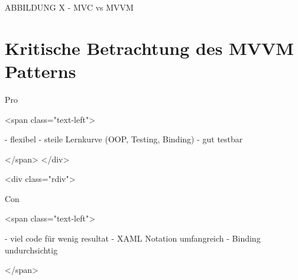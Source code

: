\documentclass[titlepage=false,12pt]{scrreprt}
\begin{document}
ABBILDUNG X - MVC vs MVVM

\chapter{Kritische Betrachtung des MVVM Patterns}



Pro

<span class="text-left">

- flexibel
- steile Lernkurve (OOP, Testing, Binding)
- gut testbar

</span>
</div>

<div class="rdiv">

Con

<span class="text-left">

- viel code für wenig resultat
- XAML Notation umfangreich
- Binding undurchsichtig

</span>
\end{document}
